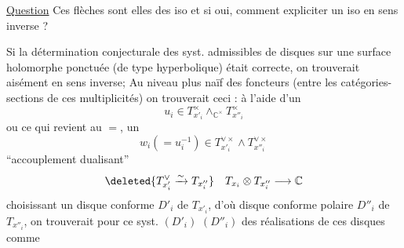 \uline{Question} Ces flèches sont elles des iso
\deleted{\unsure{--}} et si oui, comment expliciter un
iso en sens inverse ? 

Si la détermination conjecturale des
syst. admissibles de disques sur une
surface holomorphe  ponctuée (de type
hyperbolique) était correcte, on trouverait aisément
  en sens
inverse; Au niveau plus naïf des
foncteurs (entre les catégories-sections
de ces multiplicités) on trouverait
ceci : à l'aide d'un 
\[
u_i\in T_{x'_i}^{\times}\wedge_{\mathbb C^\times}T_{x''_i}^{\times}
\]
ou ce qui revient au $=$, un
\[
w_i(=u_i^{-1})\in T_{x'_i}^{\vee\times}\wedge T_{x''_i}^{\vee\times}
\]
  ``accouplement dualisant''
\[
\deleted{T_{x'_i}^{\vee}\xrightarrow{\sim} T_{x''_i}}\quad T_{x_i}\otimes T_{x''_i}\longrightarrow\mathbb C
\]
choisissant un  disque conforme
$D'_i$ de $T_{x'_i}$,  d'où disque
conforme polaire $D''_i$ de $T_{x''_i}$, on
trouverait  pour ce syst. $(D'_i)$ $(D''_i)$
des réalisations de ces disques comme
